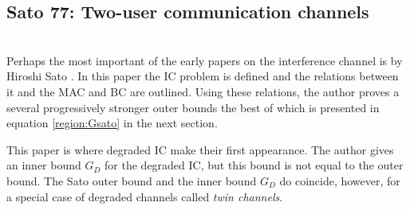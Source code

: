 \documentclass[aps,11pt,twoside,letterpaper]{article}
\begin{document}


            




        \subsection{Sato 77: Two-user communication channels} \ \\

            Perhaps the most important of the early papers on the interference channel is 
            by Hiroshi Sato \cite{Sato77}.
            In this paper the IC problem is defined and the relations between it and the
            MAC and BC are outlined.
            Using these relations, the author proves a several progressively stronger 
            outer bounds the best of which is presented in equation \eqref{region:Gsato} in
            the next section.
            
            
            This paper is where degraded IC make their first appearance.
            The author gives an inner bound $G_D$ for the degraded IC,
            but this bound is not equal to the outer bound.
            The Sato outer bound and the inner bound $G_D$ do coincide,
            however, for a special case of degraded channels called \emph{twin channels}.
            
\end{document}
